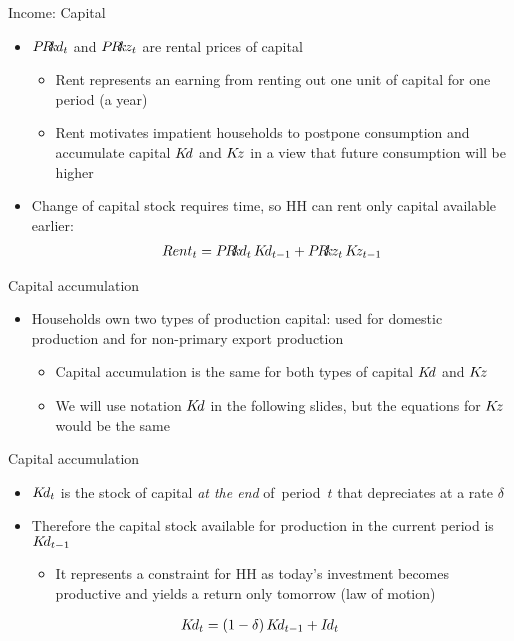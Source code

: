  \begin{frame}{Income: Capital}
 
 
   \begin{itemize}
    \item $\PRkd_{t}$ and $\PRkz_{t}$ are rental prices of capital 
     \begin{itemize}
       \item Rent represents an earning from renting out one unit of capital for one period (a year)
       \item Rent  motivates impatient households to postpone consumption and accumulate capital $K\hspace{-0.15em}d$ and $K\hspace{-0.15em}z$ in a view that future consumption will be higher
     \end{itemize}
    \item Change of capital stock requires time, so HH can rent only capital available earlier:
    \begin{gather*}
     Rent_t  = \PRkd_t\,\Kd_{t-1} + \PRkz_t\,\Kz_{t-1}
    \end{gather*}
   \end{itemize}
 
 \end{frame}
 \startframecont
 
 \begin{frame}{Capital accumulation}
  \begin{itemize}
    \item Households own two types of production capital: used for domestic production and for non-primary export production
    \begin{itemize} 
      \item Capital accumulation is the same for both types of capital $K\hspace{-0.15em}d$ and $K\hspace{-0.15em}z$ 
      \item We will use notation $K\hspace{-0.15em}d$ in the following slides, but the equations for $K\hspace{-0.15em}z$ would be the same
    \end{itemize}
  \end{itemize}
\end{frame}

\begin{frame}{Capital accumulation}
  \begin{itemize}
      \item $K\hspace{-0.15em}d_t$ is the stock of capital \emph{at the end} of~period~$t$ that depreciates at a rate $\delta$
    \item Therefore the capital stock available for production in the current period is $K\hspace{-0.15em}d_{t-1}$
    \begin{itemize}
      \item It represents a constraint for HH as today's investment becomes productive and yields a return only tomorrow (law of motion)
    \end{itemize}
  \end{itemize}
  \vspace*{-2ex}
  \begin{gather*}
    K\hspace{-0.15em}d_{t} = \left(1 - \delta \right) K\hspace{-0.15em}d_{t-1} + I\hspace{-0.1em}d_t
  \end{gather*}
\end{frame} 

